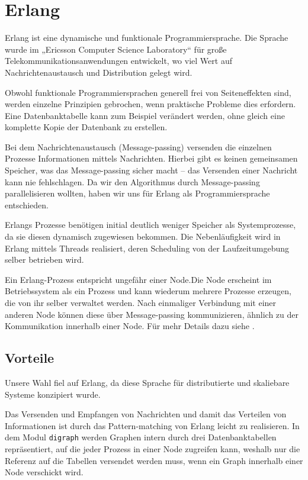 \chapter{Erlang}
Erlang ist eine dynamische und funktionale Programmiersprache.  Die
Sprache wurde im „Ericsson Computer Science Laboratory“ für große
Telekommunikationsanwendungen entwickelt, wo viel Wert auf
Nachrichtenaustausch und Distribution gelegt wird.

Obwohl funktionale Programmiersprachen generell frei von
Seiteneffekten sind, werden einzelne Prinzipien gebrochen, wenn
praktische Probleme dies erfordern.  Eine Datenbanktabelle kann zum
Beispiel verändert werden, ohne gleich eine komplette Kopie der
Datenbank zu erstellen.

Bei dem Nachrichtenaustausch (Message-passing) versenden die einzelnen
Prozesse Informationen mittels Nachrichten.  Hierbei gibt es keinen
gemeinsamen Speicher, was das Message-passing sicher macht – das
Versenden einer Nachricht kann nie fehlschlagen.  Da wir den
Algorithmus durch Message-passing parallelisieren wollten, haben wir
uns für Erlang als Programmiersprache entschieden.

Erlangs Prozesse benötigen initial deutlich weniger Speicher als
Systemprozesse, da sie diesen dynamisch zugewiesen bekommen.  Die
Nebenläufigkeit wird in Erlang mittels Threads realisiert, deren
Scheduling von der Laufzeitumgebung selber betrieben wird.

Ein Erlang-Prozess entspricht ungefähr einer Node.Die Node
erscheint im Betriebssystem als ein Prozess und kann
wiederum mehrere Prozesse erzeugen, die von ihr selber verwaltet
werden.  Nach einmaliger Verbindung mit einer anderen Node können
diese über Message-passing kommunizieren, ähnlich zu der Kommunikation
innerhalb einer Node.  Für mehr Details dazu siehe
\cite[Kapitel~„Distribunomicon“]{lyse}.

\section{Vorteile}
Unsere Wahl fiel auf Erlang, da diese Sprache für distributierte und
skaliebare Systeme konzipiert wurde.

Das Versenden und Empfangen von Nachrichten und damit das Verteilen
von Informationen ist durch das Pattern-matching von Erlang leicht zu
realisieren.  In dem Modul \lstinline!digraph!  werden Graphen intern
durch drei Datenbanktabellen repräsentiert, auf die jeder Prozess in
einer Node zugreifen kann, weshalb nur die Referenz auf die Tabellen
versendet werden muss, wenn ein Graph innerhalb einer Node verschickt
wird.

